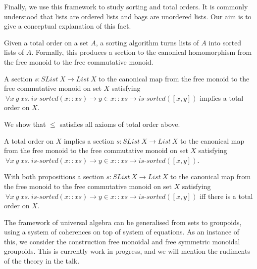 \documentclass{article}
\begin{document}
Finally, we use this framework to study sorting and total orders. It is commonly understood that lists are ordered
lists and bags are unordered lists. Our aim is to give a conceptual explanation of this fact.

Given a total order on a set $A$, a sorting algorithm turns lists of $A$ into sorted lists of $A$.
%
Formally, this produces a section to the canonical homomorphism from the free monoid to the free commutative monoid.

\begin{mythm}
    A section $s : SList \: X \rightarrow List \: X$ to the canonical map from the free monoid to the free commutative monoid on set $X$
    satisfying
    $\: \forall x \: y \: xs. \: \textit{is-sorted}(x :: xs) \rightarrow y \in x :: xs \rightarrow \textit{is-sorted}([x, y])$
    implies a total order on $X$.
\end{mythm}
We show that $\leq$ satisfies all axioms of total order above.

\begin{mythm}
    A total order on $X$ implies
    a section $s : SList \: X \rightarrow List \: X$ to the canonical map from the free monoid to the free commutative monoid on set $X$
    satisfying
    $\: \forall x \: y \: xs. \: \textit{is-sorted}(x :: xs) \rightarrow y \in x :: xs \rightarrow \textit{is-sorted}([x, y])$.
\end{mythm}
With both propositions
a section $s : SList \: X \rightarrow List \: X$ to the canonical map from the free monoid to the free commutative monoid on set $X$
satisfying
$\: \forall x \: y \: xs. \: \textit{is-sorted}(x :: xs) \rightarrow y \in x :: xs \rightarrow \textit{is-sorted}([x, y])$
iff there is a total order on $X$.


The framework of universal algebra can be generalised from sets to groupoids, using a system of coherences on top of
system of equations. As an instance of this, we consider the construction free monoidal and free symmetric monoidal
groupoids. This is currently work in progress, and we will mention the rudiments of the theory in the talk.

\printbibliography
\end{document}
